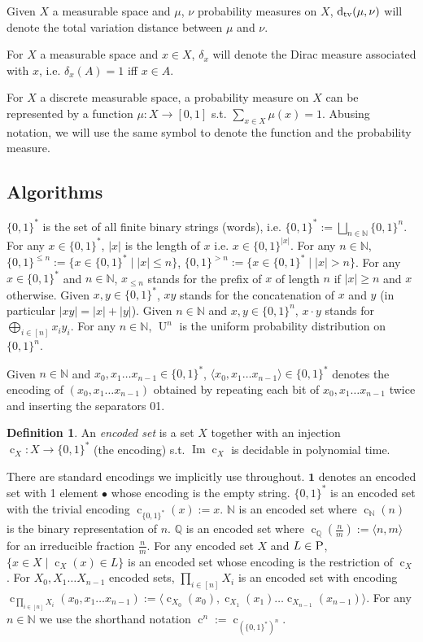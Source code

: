 \documentclass{article}
\numberwithin{equation}{section}
\theoremstyle{definition}
\newtheorem{definition}{Definition}[section]
\theoremstyle{plain}
\newcommand{\Bool}{\{0,1\}}
\newcommand{\Words}{{\Bool^*}}
\newcommand{\WordsLen}[1]{{\Bool^{#1}}}
\DeclareMathOperator{\Img}{Im}
\DeclareMathOperator{\Un}{U}
\DeclareMathOperator{\En}{c}
\newcommand{\Dtv}{\operatorname{d}_{\textnormal{tv}}}
\newcommand{\Nats}{\mathbb{N}}
\newcommand{\Rats}{\mathbb{Q}}
\newcommand{\Abs}[1]{\lvert #1 \rvert}
\newcommand{\Chev}[1]{\langle #1 \rangle}
\begin{document}
Given $X$ a measurable space and $\mu$, $\nu$ probability measures on $X$, $\Dtv(\mu,\nu)$ will denote the total variation distance between $\mu$ and $\nu$.

For $X$ a measurable space and $x \in X$, $\delta_x$ will denote the Dirac measure associated with $x$, i.e. $\delta_x(A)=1$ iff $x \in A$.

For $X$ a discrete measurable space, a probability measure on $X$ can be represented by a function $\mu: X \rightarrow [0,1]$ s.t. $\sum_{x \in X} \mu(x) = 1$. Abusing notation, we will use the same symbol to denote the function and the probability measure.

\subsection{Algorithms}

$\Words$ is the set of all finite binary strings (words), i.e. $\Words:=\bigsqcup_{n \in \Nats} \Bool^n$. For any $x \in \Words$, $\Abs{x}$ is the length of $x$ i.e. $x \in \WordsLen{\Abs{x}}$. For any $n \in \Nats$, $\Bool^{\leq n}:=\{x \in \Words \mid \Abs{x} \leq n\}$, $\Bool^{>n}:=\{x \in \Words \mid \Abs{x} > n\}$. For any $x \in \Words$ and $n \in \Nats$, $x_{\leq n}$ stands for the prefix of $x$ of length $n$ if $\Abs{x} \geq n$ and $x$ otherwise. Given $x,y \in \Words$, $xy$ stands for the concatenation of $x$ and $y$ (in particular $\Abs{xy}=\Abs{x}+\Abs{y}$). Given $n \in \Nats$ and $x,y \in \WordsLen{n}$, $x \cdot y$ stands for $\bigoplus_{i \in [n]} x_i y_i$. For any $n \in \Nats$, $\Un^n$ is the uniform probability distribution on $\WordsLen{n}$.

Given $n \in \Nats$ and ${x_0, x_1 \ldots x_{n-1} \in \Words}$, $\Chev{x_0,x_1 \ldots x_{n-1}} \in \Words$ denotes the encoding of $(x_0,x_1 \ldots x_{n-1})$ obtained by repeating each bit of $x_0, x_1 \ldots x_{n-1}$ twice and inserting the separators 01.
\begin{definition}

An \emph{encoded set} is a set $X$ together with an injection ${\En_X: X \rightarrow \Words}$ (the encoding) s.t. $\Img \En_X$ is decidable in polynomial time.

\end{definition}

There are standard encodings we implicitly use throughout. $\bm{1}$ denotes an encoded set with 1 element $\bullet$ whose encoding is the empty string. $\Words$ is an encoded set with the trivial encoding ${\En_\Words(x):=x}$. $\Nats$ is an encoded set where $\En_\Nats(n)$ is the binary representation of $n$. $\Rats$ is an encoded set where ${\En_\Rats(\frac{n}{m}):=\Chev{n,m}}$ for an irreducible fraction $\frac{n}{m}$. For any encoded set $X$ and $L \in \textsc{P}$, $\{x \in X \mid \En_X(x) \in L\}$ is an encoded set whose encoding is the restriction of $\En_X$. For $X_0,X_1 \ldots X_{n-1}$ encoded sets, $\prod_{i \in [n]} X_i$ is an encoded set with encoding $\En_{\prod_{i \in [n]} X_i}(x_0,x_1 \ldots x_{n-1}):=\Chev{\En_{X_0}(x_0),\En_{X_1}(x_1) \ldots \En_{X_{n-1}}(x_{n-1})}$. For any $n \in \Nats$ we use the shorthand notation $\En^n:=\En_{(\Words)^n}$.
\end{document}
